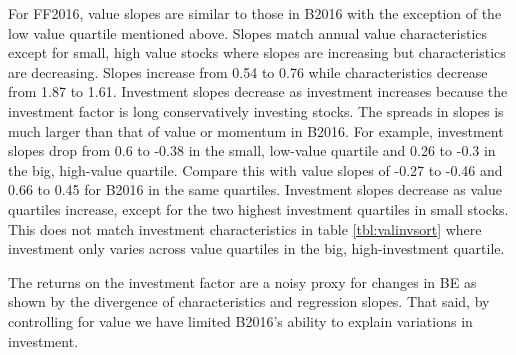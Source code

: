 For FF2016, value slopes are similar to those in B2016 with the exception of the low value
quartile mentioned above. Slopes match annual value characteristics except for small, high
value stocks where slopes are increasing but characteristics are decreasing. Slopes
increase from 0.54 to 0.76 while characteristics decrease from 1.87 to 1.61. Investment
slopes decrease as investment increases because the investment factor is long
conservatively investing stocks. The spreads in slopes is much larger than that of value
or momentum in B2016. For example, investment slopes drop from 0.6 to -0.38 in the small,
low-value quartile and 0.26 to -0.3 in the big, high-value quartile. Compare this with
value slopes of -0.27 to -0.46 and 0.66 to 0.45 for B2016 in the same quartiles.
Investment slopes decrease as value quartiles increase, except for the two highest
investment quartiles in small stocks. This does not match investment characteristics in
table \ref{tbl:valinvsort} where investment only varies across value quartiles in the big,
high-investment quartile.

The returns on the investment factor are a noisy proxy for changes in BE as shown by the
divergence of characteristics and regression slopes. That said, by controlling for value
we have limited B2016's ability to explain variations in investment.

